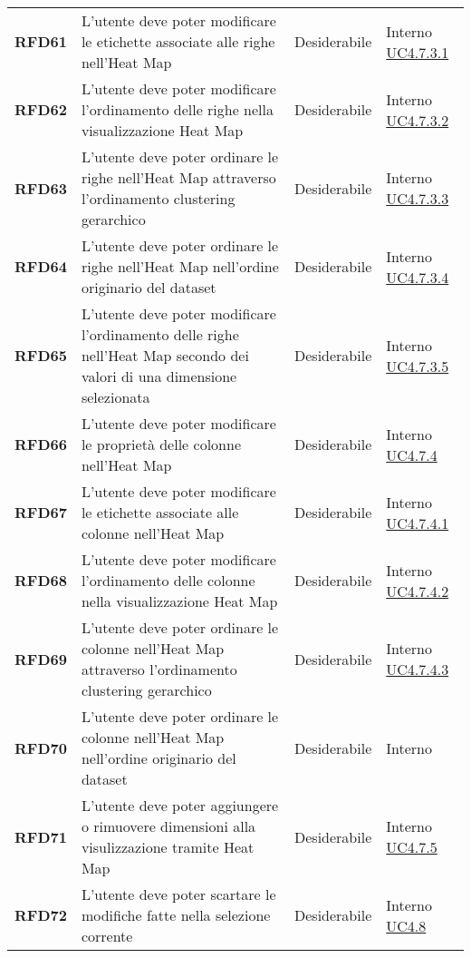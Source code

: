\begin{longtable}[H]{>{\centering\bfseries}m{2cm} >{\centering}m{9cm} >{\centering}m{2.5cm} >{\centering\arraybackslash}m{2.5cm}}
    RFD61
    & L'utente deve poter modificare le etichette associate alle righe nell'Heat Map
    & Desiderabile
    & Interno  \hyperref[spar:uc4.7.3.1]{UC4.7.3.1} \\

    RFD62
    & L'utente deve poter modificare l'ordinamento delle righe nella visualizzazione Heat Map
    & Desiderabile
    & Interno  \hyperref[spar:uc4.7.3.2]{UC4.7.3.2} \\

    RFD63
    & L'utente deve poter ordinare le righe nell'Heat Map attraverso l'ordinamento clustering gerarchico
    & Desiderabile
    & Interno  \hyperref[spar:uc4.7.3.3]{UC4.7.3.3} \\

    RFD64
    & L'utente deve poter ordinare le righe nell'Heat Map nell'ordine originario del dataset
    & Desiderabile
    & Interno  \hyperref[spar:uc4.7.3.4]{UC4.7.3.4} \\

    RFD65
    & L'utente deve poter modificare l'ordinamento delle righe nell'Heat Map secondo dei valori di una dimensione selezionata
    & Desiderabile
    & Interno  \hyperref[spar:uc4.7.3.5]{UC4.7.3.5} \\

    RFD66
    & L'utente deve poter modificare le proprietà delle colonne nell'Heat Map
    & Desiderabile
    & Interno  \hyperref[par:uc4.7.4]{UC4.7.4} \\

    RFD67
    & L'utente deve poter modificare le etichette associate alle colonne nell'Heat Map
    & Desiderabile
    & Interno  \hyperref[spar:uc4.7.4.1]{UC4.7.4.1} \\


    RFD68
    & L'utente deve poter modificare l'ordinamento delle colonne nella visualizzazione Heat Map
    & Desiderabile
    & Interno  \hyperref[spar:uc4.7.4.2]{UC4.7.4.2} \\

    RFD69
    & L'utente deve poter ordinare le colonne nell'Heat Map attraverso l'ordinamento clustering gerarchico
    & Desiderabile
    & Interno  \hyperref[spar:uc4.7.4.3]{UC4.7.4.3} \\

    RFD70
    & L'utente deve poter ordinare le colonne nell'Heat Map nell'ordine originario del dataset
    & Desiderabile
    & Interno  \hyperref[spar:uc4.7.4.4}{UC4.7.4.4} \\

    RFD71
    & L'utente deve poter aggiungere o rimuovere dimensioni alla visulizzazione tramite Heat Map
    & Desiderabile
    & Interno  \hyperref[par:uc4.7.5]{UC4.7.5} \\

    RFD72
    & L'utente deve poter scartare le modifiche fatte nella selezione corrente
    & Desiderabile
    & Interno  \hyperref[ssub:uc4.8]{UC4.8} \\

\end{longtable}
